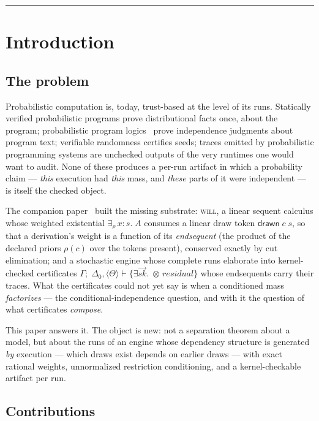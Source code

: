 \documentclass[11pt]{article}
\newcommand{\tensor}{\otimes}
\newcommand{\erho}[2]{\exists_{\rho}\, #1{:}#2.\;}
\newcommand{\dtok}[2]{\mathsf{drawn}\;#1\;#2}
\newcommand{\trz}[1]{\langle #1\rangle}
\newcommand{\Tr}{\Theta}
\newcommand{\seq}[3]{#1;\;#2\vdash #3}
\newcommand{\will}{\textsc{will}}
\theoremstyle{definition}
\theoremstyle{remark}
\begin{document}
\tableofcontents
\bigskip\hrule\bigskip

\section{Introduction}
\label{sec:intro}

\subsection{The problem}

Probabilistic computation is, today, trust-based at the level of its
runs.  Statically verified probabilistic programs
prove distributional facts once, about the program; probabilistic
program logics~\cite{BarthePSL2020,BaoDIBI2021,LilacPLDI2023} prove
independence judgments about program text; verifiable randomness
certifies seeds; traces emitted by probabilistic programming systems
are unchecked outputs of the very runtimes one would want to audit.
None of these produces a per-run artifact in which a probability claim
--- \emph{this} execution had \emph{this} mass, and \emph{these} parts
of it were independent --- is itself the checked object.

The companion paper~\cite{WillPaper} built the missing substrate:
\will{}, a linear sequent calculus whose weighted existential
$\erho{x}{s}A$ consumes a linear draw token $\dtok{c}{s}$, so that a
derivation's weight is a function of its \emph{endsequent} (the product
of the declared priors $\rho(c)$ over the tokens present), conserved
exactly by cut elimination; and a stochastic engine whose complete runs
elaborate into kernel-checked certificates
$\seq{\Gamma}{\Delta_0,\trz{\Tr}}{\{\exists \vec{sk}.\;\tensor\,
\mathit{residual}\}}$ whose endsequents carry their traces.  What the
certificates could not yet say is when a conditioned mass
\emph{factorizes} --- the conditional-independence question, and with
it the question of what certificates \emph{compose}.

This paper answers it.  The object is new: not a separation theorem
about a model, but about the runs of an engine whose dependency
structure is generated \emph{by} execution --- which draws exist
depends on earlier draws --- with exact rational weights, unnormalized
restriction conditioning, and a kernel-checkable artifact per run.

\subsection{Contributions}
\end{document}
